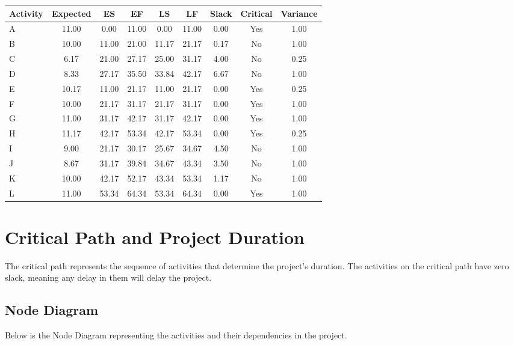 \documentclass{article}
\begin{document}
\begin{tabular}{lcccccccc}
\toprule
Activity & Expected & ES & EF & LS & LF & Slack & Critical & Variance \\
\midrule
A & 11.00 & 0.00 & 11.00 & 0.00 & 11.00 & 0.00 & Yes & 1.00 \\
B & 10.00 & 11.00 & 21.00 & 11.17 & 21.17 & 0.17 & No & 1.00 \\
C & 6.17 & 21.00 & 27.17 & 25.00 & 31.17 & 4.00 & No & 0.25 \\
D & 8.33 & 27.17 & 35.50 & 33.84 & 42.17 & 6.67 & No & 1.00 \\
E & 10.17 & 11.00 & 21.17 & 11.00 & 21.17 & 0.00 & Yes & 0.25 \\
F & 10.00 & 21.17 & 31.17 & 21.17 & 31.17 & 0.00 & Yes & 1.00 \\
G & 11.00 & 31.17 & 42.17 & 31.17 & 42.17 & 0.00 & Yes & 1.00 \\
H & 11.17 & 42.17 & 53.34 & 42.17 & 53.34 & 0.00 & Yes & 0.25 \\
I & 9.00 & 21.17 & 30.17 & 25.67 & 34.67 & 4.50 & No & 1.00 \\
J & 8.67 & 31.17 & 39.84 & 34.67 & 43.34 & 3.50 & No & 1.00 \\
K & 10.00 & 42.17 & 52.17 & 43.34 & 53.34 & 1.17 & No & 1.00 \\
L & 11.00 & 53.34 & 64.34 & 53.34 & 64.34 & 0.00 & Yes & 1.00 \\
\bottomrule
\end{tabular}

\vspace{1em} %

\pagebreak
\section*{Critical Path and Project Duration}
The critical path represents the sequence of activities that determine the project's duration. The activities on the critical path have zero slack, meaning any delay in them will delay the project.

\subsection{Node Diagram}
Below is the Node Diagram representing the activities and their dependencies in the project.
\end{document}
